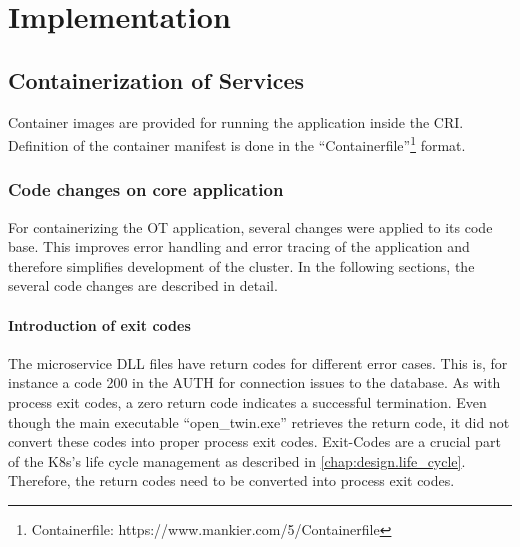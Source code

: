 \chapter{Implementation} %

\label{chap:implementation} %



\section{Containerization of Services}
Container images are provided for running the application inside the \ac{CRI}. Definition of the container manifest is done in the \enquote{Containerfile}\footnote{Containerfile: https://www.mankier.com/5/Containerfile} format.


\subsection{Code changes on core application}
For containerizing the \ac{OT} application, several changes were applied to its code base. This improves error handling and error tracing of the application and therefore simplifies development of the cluster. In the following sections, the several code changes are described in detail.

\subsubsection*{Introduction of exit codes}
The microservice \ac{DLL} files have return codes for different error cases. This is, for instance a code 200 in the \ac{AUTH} for connection issues to the database. As with process exit codes, a zero return code indicates a successful termination. Even though the main executable \enquote{open\_twin.exe} retrieves the return code, it did not convert these codes into proper process exit codes. 
Exit-Codes are a crucial part of the \ac{K8s}'s life cycle management as described in \autoref{chap:design.life_cycle}. Therefore, the return codes need to be converted into process exit codes.

